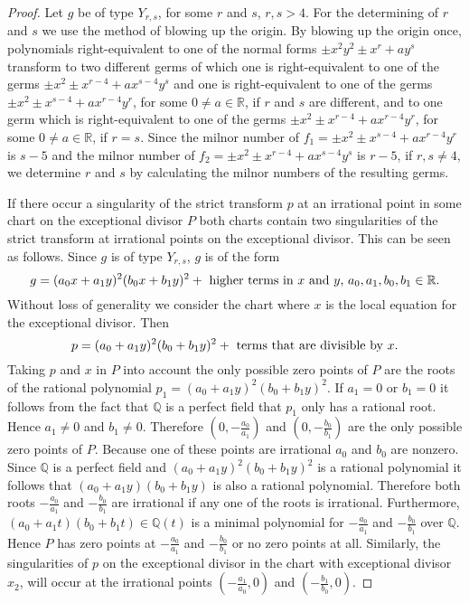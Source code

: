 \documentclass[noend]{amsproc}
\theoremstyle{definition}
\begin{document}
\begin{proof}
Let $g$ be of type $Y_{r,s}$, for some $r$ and $s$,
$r,s>4$. For the determining of $r$ and $s$ we use the method of blowing up the origin.
By blowing up the origin once, polynomials right-equivalent to one of the
normal forms $\pm x^2y^2\pm x^r+ay^s$ transform to two different germs of which
one is right-equivalent to one of the germs $\pm x^2\pm x^{r-4}+ax^{s-4}y^s$
and one is right-equivalent to one of the germs  $\pm x^2\pm
x^{s-4}+ax^{r-4}y^r$, for some $0\neq a\in \mathbb R$, if $r$ and $s$ are
different, and to one germ which is right-equivalent to one of the germs $\pm
x^2\pm x^{r-4}+ax^{r-4}y^r$, for some $0\neq a\in\mathbb R$, if  $r=s$. Since
the milnor number of $f_1=\pm x^2\pm x^{s-4}+ax^{r-4}y^r$ is $s-5$ and the
milnor number of $f_2=\pm x^2\pm x^{r-4}+ax^{s-4}y^s$  is $r-5$, if $r,s\neq
4$, we determine $r$ and $s$ by calculating the milnor numbers of the resulting
germs. 


If there occur a singularity of the strict transform $p$ at an irrational point in some chart on the
exceptional divisor $P$ both charts contain two singularities of the strict
transform at irrational points on the exceptional divisor. This can be seen as follows. Since $g$ is of
type $Y_{r,s}$, $g$ is of the form
\[g=(a_0x+a_1y)^2(b_0x+b_1y)^2+\textnormal{ higher terms in $x$ and
$y$, $a_0,a_1,b_0,b_1\in\mathbb R$.}\] Without loss of generality we consider
the chart where $x$ is the local equation for the exceptional divisor. Then
\[p=(a_0+a_1y)^2(b_0+b_1y)^2+\textnormal{ terms that are divisible by
$x$.}\] Taking $p$ and $x$ in $P$ into account the only possible zero
points of $P$ are the roots of the rational polynomial $p_1 =
(a_0+a_1y)^2(b_0+b_1y)^2$. If $a_1=0$ or $b_1=0$ it follows from the fact
that $\mathbb Q$ is a perfect field that $p_1$ only has a rational root. Hence
$a_1\neq 0$ and $b_1\neq 0$. Therefore   $(0,-\frac{a_0}{a_1})$ and
$(0,-\frac{b_0}{b_1})$ are the only possible zero points of $P$. Because one of
these points are irrational $a_0$ and $b_0$ are nonzero. Since $\mathbb Q$ is a
perfect field and $(a_0+a_1y)^2(b_0+b_1y)^2$ is  a rational polynomial it
follows that $(a_0+a_1y)(b_0+b_1y)$ is also a rational polynomial.
Therefore both roots $-\frac{a_0}{a_1}$ and $-\frac{b_0}{b_1}$ are irrational
if any one of the roots is irrational. Furthermore,
$(a_0+a_1t)(b_0+b_1t)\in\mathbb Q(t)$ is a minimal polynomial for
$-\frac{a_0}{a_1}$ and $-\frac{b_0}{b_1}$ over $\mathbb Q$. Hence $P$ has zero
points at $-\frac{a_0}{a_1}$ and $-\frac{b_0}{b_1}$ or no zero points at all. Similarly, the
singularities of $p$ on the exceptional divisor in the chart with exceptional
divisor $x_2$, will occur at the irrational points $(-\frac{a_1}{a_0},0)$ and
$(-\frac{b_1}{b_0},0)$.


\end{proof}
\end{document}
